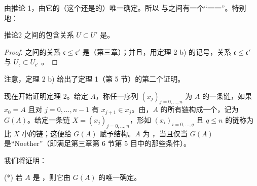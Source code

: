 由推论 1，由它的（这个还是的）唯一确定。所以 与之间有一个“一一”。特别地：
\begin{SGAresult}{推论}{2}
之间的包含关系 $U\subset U'$ 是。
\end{SGAresult}
\begin{proof}
之间的关系 $\mathfrak{c}\leq\mathfrak{c}'$ 是（第三章）；并且，用定理 2 b) 的记号，关系 $\mathfrak{c}\leq\mathfrak{c}'$ 与 $U_{\mathfrak{c}}\subset U_{\mathfrak{c}'}$ 。
\end{proof}
注意，定理 2 b) 给出了定理 1（第 5 节）的第二个证明。

现在开始证明定理 2。给定 $A$，称任一序列 $(x_j)_{j=0,\ldots,n}$ 为 $A$ 的一条链，如果 $x_0=A$ 且对 $j=0,\ldots,n-1$ 有 $x_{j+1}\in x_j$。由，$A$ 的所有链构成一个，记为 $G(A)$。给定一条链 $X=(x_j)_{j=0,\ldots,n}$，形如 $(x_i)_{i=0,\ldots,q}$ 且 $q\leq n$ 的链称为比 $X$ 小的链；这便给 $G(A)$ 赋予结构。$A$ 为 ，当且仅当 $G(A)$ 是“Noether”（即满足第三章第 6 节第 5 目中的那些条件）。

我们将证明：

(*) 若 $A$ 是 ，则它由 $G(A)$ 的唯一确定。

